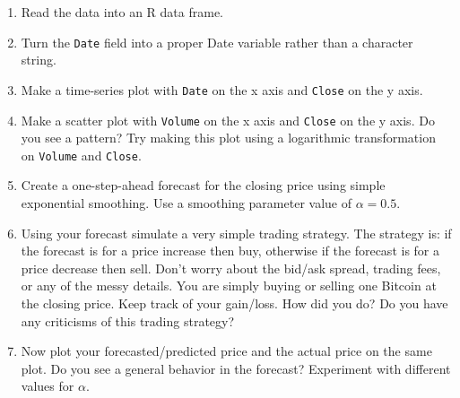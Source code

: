 \begin{enumerate}
\begin{enumerate}
\item Read the data into an R data frame.
\item Turn the \texttt{Date} field into a proper Date variable rather
  than a character string.
\item Make a time-series plot with \texttt{Date} on the x axis and
  \texttt{Close} on the y axis.
\item Make a scatter plot with \texttt{Volume} on the x axis and
  \texttt{Close} on the y axis. Do you see a pattern? Try making
  this plot using a logarithmic transformation on \texttt{Volume} and
  \texttt{Close}.
\item Create a one-step-ahead forecast for the closing price using
  simple exponential smoothing. Use a smoothing parameter value
  of $\alpha = 0.5$.
\item Using your forecast simulate a very simple trading strategy.
  The strategy is: if the forecast is for a price increase then buy,
  otherwise if the forecast is for a price decrease then sell. Don't
  worry about the bid/ask spread, trading fees, or any of the messy
  details. You are simply buying or selling one Bitcoin at the closing
  price. Keep track of your gain/loss. How did you do? Do you
  have any criticisms of this trading strategy?
\item  Now plot your forecasted/predicted price and the actual price
  on the same plot. Do you see a general behavior in the forecast?
  Experiment with different values for $\alpha$.
\end{enumerate}
  
\end{enumerate}

